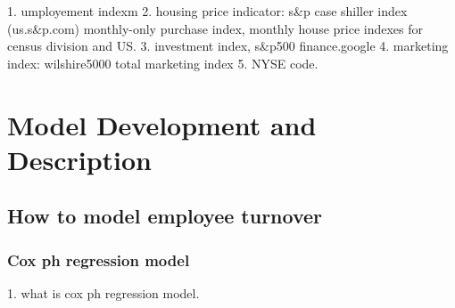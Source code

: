 \documentclass[12pt,letterpaper]{article}
\begin{document}
1. umployement indexm
2. housing price indicator: s\&p case shiller  index   (us.s\&p.com)  monthly-only purchase index, monthly house price indexes for census division and US.
3. investment index, s\&p500  finance.google 
4. marketing index:  wilshire5000  total marketing  index
5. NYSE code.

\section{Model Development and Description} 
\subsection{How to model employee turnover}
\subsubsection{Cox ph regression model}
   1. what is cox ph regression model.
%   
\end{document}
